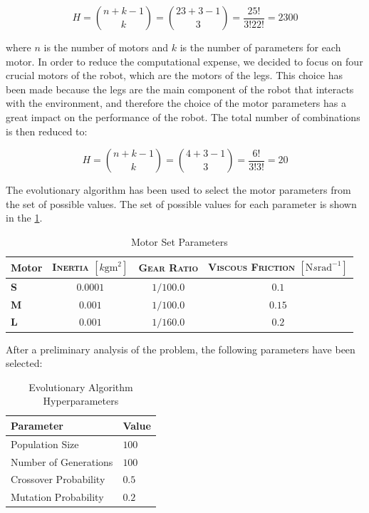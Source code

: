 \begin{equation}
    H = \binom{n + k - 1}{k} = \binom{23 + 3 - 1}{3} = \frac{25!}{3! 22!} = 2300
\end{equation}

where $n$ is the number of motors and $k$ is the number of parameters for each motor. In order to reduce the computational expense, we decided to focus on four crucial motors of the robot, which are the motors of the legs. This choice has been made because the legs are the main component of the robot that interacts with the environment, and therefore the choice of the motor parameters has a great impact on the performance of the robot. The total number of combinations is then reduced to:

\begin{equation}
    H = \binom{n + k - 1}{k} = \binom{4 + 3 - 1}{3} = \frac{6!}{3! 3!} = 20
\end{equation}

The evolutionary algorithm has been used to select the motor parameters from the set of possible values. The set of possible values for each parameter is shown in the \cref{tab:motorparams}.

\begin{table}[h]
    \centering
    \begin{tabular}{l c c c}
        \toprule
        \textbf{Motor} & \textsc{Inertia} $[k\mathrm{gm}^2]$ & \textsc{Gear Ratio} & \textsc{Viscous Friction} $[\mathrm{N}s\mathrm{rad}^{-1}]$ \\
        \midrule
        \textbf{S}     & $0.0001$                            & $1/100.0$           & $0.1$                                                      \\
        \textbf{M}     & $0.001$                             & $1/100.0$           & $0.15$                                                     \\
        \textbf{L}     & $0.001$                             & $1/160.0$           & $0.2$                                                      \\
        \bottomrule
    \end{tabular}
    \caption{Motor Set Parameters}
    \label{tab:motorparams}
\end{table}


After a preliminary analysis of the problem, the following parameters have been selected:

\begin{table}
    \centering
    \begin{tabular}{ll}
        \toprule
        \textbf{Parameter}    & \textbf{Value} \\
        \midrule
        Population Size       & $100$          \\
        Number of Generations & $100$          \\
        Crossover Probability & $0.5$          \\
        Mutation Probability  & $0.2$          \\
        \bottomrule
    \end{tabular}
    \caption{Evolutionary Algorithm Hyperparameters}
\end{table}

